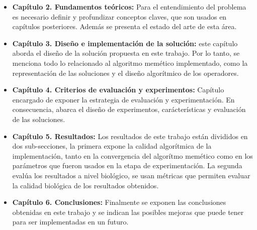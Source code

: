 \begin{itemize}
	\item \textbf{Capítulo 2. Fundamentos teóricos: }Para el entendimiento del problema es necesario definir y profundizar conceptos claves, que son usados en capítulos posteriores. Además se presenta el estado del arte de esta área.
	\item \textbf{Capítulo 3. Diseño e implementación de la solución: }este capítulo aborda el diseño de la solución propuesta en este trabajo. Por lo tanto, se menciona todo lo relacionado al algoritmo memético implementado, como la representación de las soluciones y el diseño algorítmico de los operadores.
	\item \textbf{Capítulo 4. Criterios de evaluación y experimentos: } Capítulo encargado de exponer la estrategia de evaluación y experimentación. En consecuencia, abarca el diseño de experimentos, carácterísticas y evaluación de las soluciones.
	\item \textbf{Capítulo 5. Resultados: }Los resultados de este trabajo están divididos en dos sub-secciones, la primera expone la calidad algorítmica de la implementación, tanto en la convergencia del algorítmo memético como en los parámetros que fueron usados en la etapa de experimentación.
La segunda evalúa los resultados a nivel biológico, se usan métricas que permiten evaluar la calidad biológica de los resultados obtenidos.
	\item \textbf{Capítulo 6. Conclusiones: }Finalmente se exponen las conclusiones obtenidas en este trabajo y se indican las posibles mejoras que puede tener para ser implementadas en un futuro.
\end{itemize}